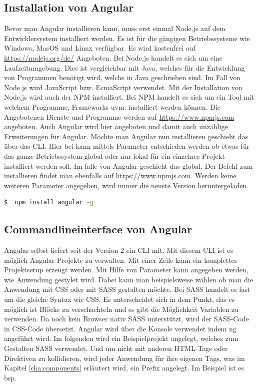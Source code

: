 \subsection{Installation von Angular}
Bevor man Angular installieren kann, muss erst einmal Node.js auf dem Entwicklersystem installiert werden. Es ist für die gängigen Betriebssysteme wie Windows, MacOS und Linux verfügbar. Es wird kostenfrei auf \url{https://nodejs.org/de/} Angeboten. Bei Node.js handelt es sich um eine Laufzeitumgebung. \autocite{Node.js.2018} Dies ist vergleichbar mit Java, welches für die Entwicklung von Programmen benötigt wird, welche in Java geschrieben sind. Im Fall von Node.js wird JavaScript \ac{bzw.} EcmaScript verwendet. Mit der Installation von Node.js wird auch der \ac{NPM} installiert. Bei \ac{NPM} handelt es sich um ein Tool mit welchem Programme, Frameworks \ac{uvm.} installiert werden können. Die Angebotenen Dienste und Programme werden auf \url{https://www.npmjs.com} angeboten. Auch Angular wird hier angeboten und damit auch unzählige Erweiterungen für Angular. Möchte man Angular nun installieren geschieht das über das \acl{CLI}. Hier bei kann mittels Parameter entschieden werden ob etwas für das ganze Betriebssystem global oder nur lokal für ein einzelnes Projekt installiert werden soll. Im falle von Angular geschieht das global. Der Befehl zum installieren findet man ebenfalls auf \url{https://www.npmjs.com}. Werden keine weiteren Parameter angegeben, wird immer die neuste Version heruntergeladen.

\begin{lstlisting}[language=sh, frame=single]
$  npm install angular -g
\end{lstlisting} 

\subsection{Commandlineinterface von Angular}
Angular selbst liefert seit der Version 2 ein \acl{CLI} mit. Mit diesem \ac{CLI} ist es möglich Angular Projekte zu verwalten. Mit einer Zeile kann ein komplettes Projektsetup erzeugt werden. Mit Hilfe von Parameter kann angegeben werden, wie Anwendung gestylet wird. Dabei kann man beispielsweise wählen ob man die Anwendung mit \ac{CSS} oder mit \ac{SASS} gestalten möchte. Bei \ac{SASS} handelt es fast um die gleiche Syntax wie \ac{CSS}. Es unterscheidet sich in dem Punkt, das es möglich ist Blöcke zu verschachteln und es gibt die Möglichkeit Variablen zu verwenden. Da noch kein Browser nativ \ac{SASS} unterstützt, wird der \ac{SASS}-Code in \ac{CSS}-Code übersetzt. Angular wird über die Konsole verwendet indem ng angeführt wird. Im folgenden wird ein Beispielprojekt angelegt, welches zum Gestalten \ac{SASS} verwendet. Und um nicht mit anderen \ac{HTML}-Tags oder Direktiven zu kollidieren, wird jeder Anwendung für ihre eigenen Tags, was im Kapitel \ref{cha:components} erläutert wird, ein Prefix angelegt. Im Beispiel ist es bsp.


